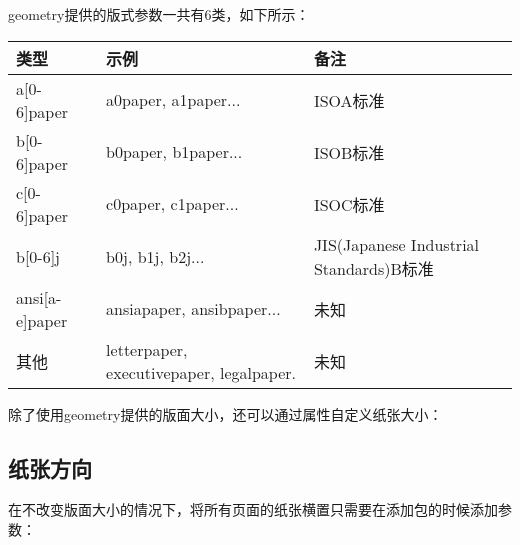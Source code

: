     geometry提供的版式参数一共有6类，如下所示：
    \begin{center}
        \setlength\tablewidth{\dimexpr (\textwidth -6\tabcolsep)}
        \begin{table}[H]
            \begin{tabular}{|p{0.33\tablewidth}<{\centering}|p{0.33\tablewidth}<{\centering}|p{0.33\tablewidth}<{\centering}|}
                \hline
                类型&示例&备注\\
                \hline
                a[0-6]paper&a0paper, a1paper...&ISOA标准\\
                \hline
                b[0-6]paper&b0paper, b1paper...&ISOB标准\\
                \hline
                c[0-6]paper&c0paper, c1paper...&ISOC标准\\
                \hline
                b[0-6]j&b0j, b1j, b2j...&JIS(Japanese Industrial Standards)B标准\\
                \hline
                ansi[a-e]paper&ansiapaper, ansibpaper...&未知\\
                \hline
                其他&letterpaper, executivepaper, legalpaper.&未知\\
                \hline
            \end{tabular}
        \end{table}
    \end{center}
    
    除了使用geometry提供的版面大小，还可以通过属性自定义纸张大小：
    \begin{texcode}
        \usepackage[papersize={20cm, 15cm}]{geometry}%
    \end{texcode}

    \subsection{纸张方向}
    在不改变版面大小的情况下，将所有页面的纸张横置只需要在添加包的时候添加参数：
    \begin{texcode}
        \usepackage[landscape]{geometry}    
    \end{texcode}

